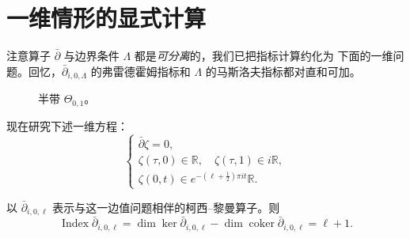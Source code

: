 \section{一维情形的显式计算}
\label{sec:app-c-one-dimensional-calculation}

注意算子 $\bar\partial$ 与边界条件 $\Lambda$ 都是\emph{可分离}的，我们已把指标计算约化为
下面的一维问题。回忆，$\bar\partial_{i,0,\Lambda}$ 的弗雷德霍姆指标和
$\Lambda$ 的马斯洛夫指标都对直和可加。

\begin{figure}[htbp]
\centering
{}
\caption{半带 $\Theta_{0,1}$。}
\label{fig:app-c-semi-strip}
\end{figure}

现在研究下述一维方程：
\begin{equation}
\label{eq:app-c-one-dimensional-problem}
 \begin{cases}
 \bar\partial\zeta=0,\\
 \zeta(\tau,0)\in\mathbb R,\quad\zeta(\tau,1)\in i\mathbb R,\\
 \zeta(0,t)\in e^{-(\ell+\frac12)\pi it}\mathbb R.
 \end{cases}
\end{equation}

\begin{proposition}
\label{prop:app-c-one-dimensional-index}
以 $\bar\partial_{i,0,\ell}$ 表示与这一边值问题相伴的柯西--黎曼算子。则
\begin{equation}
\label{eq:app-c-one-dimensional-index}
 \operatorname{Index}\bar\partial_{i,0,\ell}
 =\dim\ker\bar\partial_{i,0,\ell}
  -\dim\operatorname{coker}\bar\partial_{i,0,\ell}
 =\ell+1.
\end{equation}
\end{proposition}

